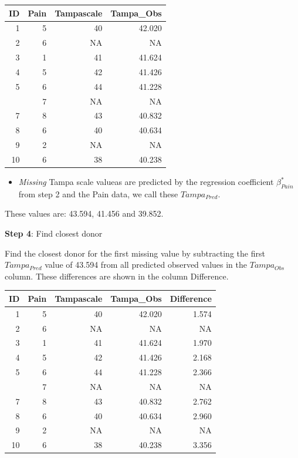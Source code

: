 \documentclass[]{book}
\providecommand{\tightlist}{%
  \setlength{\itemsep}{0pt}\setlength{\parskip}{0pt}}
\theoremstyle{definition}
\theoremstyle{definition}
\theoremstyle{definition}
\theoremstyle{remark}
\begin{document}
\begin{tabular}{rrrr}
\toprule
ID & Pain & Tampascale & Tampa\_Obs\\
\midrule
1 & 5 & 40 & 42.020\\
2 & 6 & NA & NA\\
3 & 1 & 41 & 41.624\\
4 & 5 & 42 & 41.426\\
5 & 6 & 44 & 41.228\\
\addlinespace
6 & 7 & NA & NA\\
7 & 8 & 43 & 40.832\\
8 & 6 & 40 & 40.634\\
9 & 2 & NA & NA\\
10 & 6 & 38 & 40.238\\
\bottomrule
\end{tabular}

\begin{itemize}
\tightlist
\item
  \emph{Missing} Tampa scale valueas are predicted by the regression
  coefficient \(\beta_{Pain}^*\) from step 2 and the Pain data, we call
  these \(Tampa_{Pred}\).
\end{itemize}

These values are: 43.594, 41.456 and 39.852.

\textbf{Step 4}: Find closest donor

Find the closest donor for the first missing value by subtracting the
first \(Tampa_{Pred}\) value of 43.594 from all predicted observed
values in the \(Tampa_{Obs}\) column. These differences are shown in the
column Difference.

\begin{tabular}{rrrrr}
\toprule
ID & Pain & Tampascale & Tampa\_Obs & Difference\\
\midrule
1 & 5 & 40 & 42.020 & 1.574\\
2 & 6 & NA & NA & NA\\
3 & 1 & 41 & 41.624 & 1.970\\
4 & 5 & 42 & 41.426 & 2.168\\
5 & 6 & 44 & 41.228 & 2.366\\
\addlinespace
6 & 7 & NA & NA & NA\\
7 & 8 & 43 & 40.832 & 2.762\\
8 & 6 & 40 & 40.634 & 2.960\\
9 & 2 & NA & NA & NA\\
10 & 6 & 38 & 40.238 & 3.356\\
\bottomrule
\end{tabular}
\end{document}
